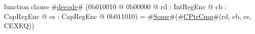 function clause #\hyperref[zdecode]{decode}# (0b010010 @ 0b00000 @ rd : IntRegEnc @ cb : CapRegEnc @ cs : CapRegEnc @ 0b011010) = #\hyperref[zSome]{Some}#(#\hyperref[zCPtrCmp]{CPtrCmp}#(rd, cb, cs, CEXEQ))
